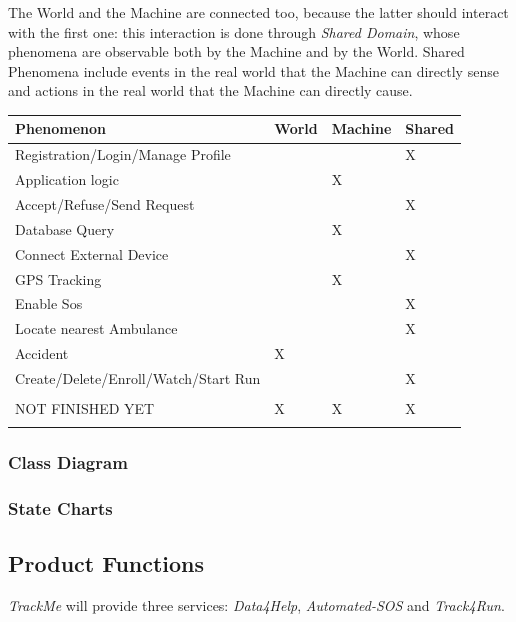 \documentclass[a4paper]{article}
\begin{document}
    The World and the Machine are connected too, because the latter should interact with the first one: this interaction is done through \textit{Shared Domain}, whose phenomena are observable both by the Machine and by the World. Shared Phenomena include events in the real world that the Machine can directly sense and actions in the real world that the Machine can directly cause.
    \begin{table}[!ht]
    \centering
    \begin{tabular}{|l|l|l|l|}
    \hline
     \textbf{Phenomenon} & \textbf{World} & \textbf{Machine} & \textbf{Shared}\\ \hline
     Registration/Login/Manage Profile & & & X \\ \hline
     Application logic & & X & \\ \hline
     Accept/Refuse/Send Request & & & X \\ \hline
     Database Query & & X & \\ \hline
     Connect External Device & & & X \\ \hline
     GPS Tracking & & X & \\ \hline
     Enable Sos & & & X \\ \hline
     Locate nearest Ambulance & & & X \\ \hline
     Accident & X & & \\ \hline
     Create/Delete/Enroll/Watch/Start Run & & & X \\ \hline
     & & & \\ \hline
     NOT FINISHED YET & X & X & X \\ \hline
     & & & \\ \hline
    \end{tabular}
    \end{table}
    
    
    \subsubsection{Class Diagram}
    
    \subsubsection{State Charts}
    
    \subsection{Product Functions}
    \textit{TrackMe} will provide three services: \textit{Data4Help}, \textit{Automated-SOS} and \textit{Track4Run}.
    
\end{document}
